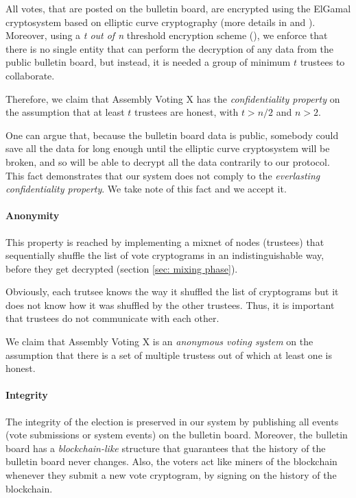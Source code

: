 All votes, that are posted on the bulletin board, are encrypted using the ElGamal cryptosystem based on elliptic curve cryptography (more details in  and ). Moreover, using a \textit{t out of n} threshold encryption scheme (), we enforce that there is no single entity that can perform the decryption of any data from the public bulletin board, but instead, it is needed a group of minimum $t$ trustees to collaborate.

Therefore, we claim that Assembly Voting X has the \textit{confidentiality property} on the assumption that at least $t$ trustees are honest, with \( t > n / 2 \) and \( n > 2 \).

One can argue that, because the bulletin board data is public, somebody could save all the data for long enough until the elliptic curve cryptosystem will be broken, and so will be able to decrypt all the data contrarily to our protocol. This fact demonstrates that our system does not comply to the \textit{everlasting confidentiality property}. We take note of this fact and we accept it.

\paragraph{Anonymity}
This property is reached by implementing a mixnet of nodes (trustees) that sequentially shuffle the list of vote cryptograms in an indistinguishable way, before they get decrypted (section \ref{sec: mixing phase}).

Obviously, each trutsee knows the way it shuffled the list of cryptograms but it does not know how it was shuffled by the other trustees. Thus, it is important that trustees do not communicate with each other.

We claim that Assembly Voting X is an \textit{anonymous voting system} on the assumption that there is a set of multiple trustess out of which at least one is honest.

\paragraph{Integrity}
The integrity of the election is preserved in our system by publishing all events (vote submissions or system events) on the bulletin board. Moreover, the bulletin board has a \textit{blockchain-like} structure that guarantees that the history of the bulletin board never changes. Also, the voters act like miners of the blockchain whenever they submit a new vote cryptogram, by signing on the history of the blockchain.

